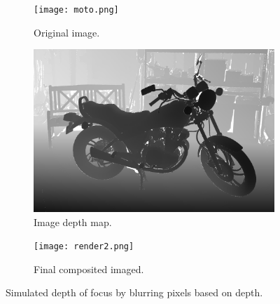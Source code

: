 \documentclass[12pt]{article}
\begin{document}
\begin{figure}[h!]
  \begin{subfigure}[b]{0.4\linewidth}
    \texttt{[image: moto.png]}
    \caption{Original image.}
  \end{subfigure}
  \begin{subfigure}[b]{0.4\linewidth}
    \includegraphics[width=\linewidth]{moto_d.png}
    \caption{Image depth map.}
  \end{subfigure}
  \begin{subfigure}[b]{0.55\linewidth}
    \texttt{[image: render2.png]}
    \caption{Final composited imaged.}
  \end{subfigure}

  \caption{Simulated depth of focus by blurring pixels based on depth.}
  \label{fig:blur1}
\end{figure}




\clearpage
\printbibliography[heading=bibintoc]
\end{document}
